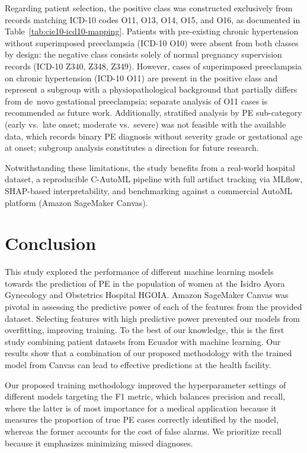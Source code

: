 \documentclass[diagnostics,article,submit,pdftex,moreauthors]{Definitions/mdpi}
\begin{document}
Regarding patient selection, the positive class was constructed
exclusively from records matching ICD-10 codes O11, O13, O14, O15, and O16,
as documented in Table~\ref{tab:cie10-icd10-mapping}. Patients with pre-existing
chronic hypertension without superimposed preeclampsia (ICD-10 O10) were absent
from both classes by design: the negative class consists solely of normal
pregnancy supervision records (ICD-10 Z340, Z348, Z349). However, cases of
superimposed preeclampsia on chronic hypertension (ICD-10 O11) are present in
the positive class and represent a subgroup with a physiopathological background
that partially differs from de~novo gestational preeclampsia; separate analysis
of O11 cases is recommended as future work. Additionally, stratified analysis by
\ac{PE} sub-category (early vs.\ late onset; moderate vs.\ severe) was not
feasible with the available data, which records binary \ac{PE} diagnosis without
severity grade or gestational age at onset; subgroup analysis constitutes a
direction for future research.

Notwithstanding these limitations, the study benefits from
a real-world hospital dataset, a reproducible C-AutoML pipeline with full
artifact tracking via MLflow, SHAP-based interpretability, and benchmarking
against a commercial AutoML platform (Amazon SageMaker Canvas).

\section{Conclusion}
\label{sec:conclusion}
This study explored the performance of different machine learning
models towards the prediction of \ac{PE} in the population of
women at the Isidro Ayora Gynecology and Obstetrics Hospital \ac{HGOIA}.
Amazon SageMaker Canvas was pivotal in
assessing the predictive power of each of the features from the
provided dataset. Selecting features with high predictive power
prevented our models from overfitting, improving training. To the best of our
knowledge, this is the first study combining patient datasets from
Ecuador with machine learning. Our results show that a combination of
our proposed methodology with the trained model from Canvas can lead
to effective predictions at the health facility.

Our proposed training methodology improved the hyperparameter settings
of different models targeting the \ac{F1} metric, which balances
precision and recall, where the latter is of most importance for a
medical application because it measures the proportion of true
\ac{PE} cases correctly identified by the model, whereas the
former accounts for the cost of false alarms. We prioritize recall
because it emphasizes minimizing missed diagnoses.
\end{document}
